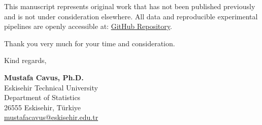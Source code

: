 \documentclass[11pt,a4paper]{article}
\begin{document}
This manuscript represents original work that has not been published previously and is not under consideration elsewhere. All data and reproducible experimental pipelines are openly accessible at: \href{https://github.com/mcavs/explainable-hotel-booking-cancellation-predictive-models}{GitHub Repository}.

Thank you very much for your time and consideration.

\vspace{0.4cm}
Kind regards,

\vspace{0.2cm}
\textbf{Mustafa Cavus, Ph.D.} \\
Eskisehir Technical University \\
Department of Statistics \\
26555 Eskisehir, T\"urkiye \\
\href{mailto:mustafacavus@eskisehir.edu.tr}{mustafacavus@eskisehir.edu.tr}
\end{document}

